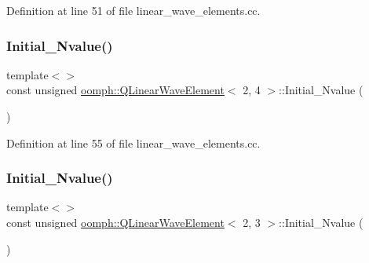 Definition at line 51 of file linear\+\_\+wave\+\_\+elements.\+cc.

\mbox{\label{classoomph_1_1QLinearWaveElement_a5ef241ca3154ed12cefc8c802e7d3e02}} 
\subsubsection{\texorpdfstring{Initial\+\_\+\+Nvalue()}{Initial\_Nvalue()}\hspace{0.1cm}{\footnotesize\ttfamily [4/9]}}
{\footnotesize\ttfamily template$<$$>$ \\
const unsigned \hyperlink{classoomph_1_1QLinearWaveElement}{oomph\+::\+Q\+Linear\+Wave\+Element}$<$ 2, 4 $>$\+::Initial\+\_\+\+Nvalue (\begin{DoxyParamCaption}{ }\end{DoxyParamCaption})\hspace{0.3cm}{\ttfamily [private]}}



Definition at line 55 of file linear\+\_\+wave\+\_\+elements.\+cc.

\mbox{\label{classoomph_1_1QLinearWaveElement_a0fea31f6262c09a227736f22c1a64e85}} 
\subsubsection{\texorpdfstring{Initial\+\_\+\+Nvalue()}{Initial\_Nvalue()}\hspace{0.1cm}{\footnotesize\ttfamily [5/9]}}
{\footnotesize\ttfamily template$<$$>$ \\
const unsigned \hyperlink{classoomph_1_1QLinearWaveElement}{oomph\+::\+Q\+Linear\+Wave\+Element}$<$ 2, 3 $>$\+::Initial\+\_\+\+Nvalue (\begin{DoxyParamCaption}{ }\end{DoxyParamCaption})\hspace{0.3cm}{\ttfamily [private]}}



